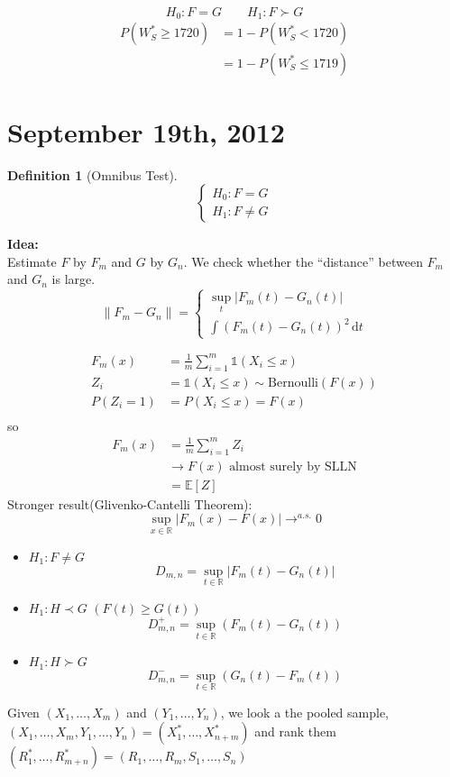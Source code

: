 \documentclass[a4paper,12pt]{amsart}
\newcommand{\sumim}{\sum_{i=1}^m}
\newcommand{\dt}{\,\mathrm{d}t}
\newcommand{\E}[1]{\mathbb{E}\left[#1\right]}
\newtheorem{defn}{Definition}
\begin{document}
\[H_0: F =G \qquad H_1: F \succ G\]
\begin{align*}
P(W_S^* \geq 1720 ) &= 1 - P(W_S^* < 1720)\\
&= 1 - P(W_S^* \leq 1719)
\end{align*}


\section{September 19th, 2012}
\begin{defn}[Omnibus Test]
\[\begin{cases}
H_0: F=G\\
H_1: F \neq G
\end{cases}\]
\end{defn}
\noindent
\textbf{Idea:}\\
Estimate $F$ by $F_m$ and $G$ by $G_n$. We check whether the ``distance'' between $F_m$ and $G_n$ is large.
\[\|F_m - G_n\| = 
\begin{cases}
\sup_t |F_m(t) - G_n(t)|\\
\int (F_m(t)-G_n(t))^2 \dt
\end{cases}
\]

\begin{align*}
F_m(x) &= \frac{1}{m}\sumim \mathds{1}(X_i\leq x)\\
Z_i &= \mathds{1}(X_i \leq x) \sim \mbox{Bernoulli}(F(x))\\
P(Z_i = 1) &= P(X_i \leq x) = F(x)\\
\end{align*}
so
\begin{align*}
F_m(x) &= \frac{1}{m}\sumim Z_i\\
&\to F(x) \mbox{ almost surely by SLLN}\\
&= \E{Z}
\end{align*}
\noindent
Stronger result(Glivenko-Cantelli Theorem):\\
\[\sup_{x \in \mathbb{R}} |F_m(x) - F(x)| \to^{a.s.} 0 \]

\begin{itemize}
\item $H_1: F \neq G$
\[D_{m,n} = \sup_{t \in \mathbb{R}} |F_m(t) - G_n(t)|\]
\item $H_1: H \prec G$ $(F(t) \geq G(t))$
\[D_{m,n}^+ = \sup_{t \in \mathbb{R}} (F_m(t) - G_n(t))\]
\item $H_1: H \succ G$
\[D_{m,n}^- = \sup_{t \in \mathbb{R}} (G_n(t) - F_m(t))\]
\end{itemize}


\noindent
Given $(X_1,\ldots,X_m)$ and $(Y_1,\ldots,Y_n)$, we look a the pooled sample, $(X_1,\ldots,X_m,Y_1,\ldots,Y_n) = (X_1^*, \ldots, X_{n+m}^*)$ and rank them
$(R_1^*, \ldots, R_{m+n}^*) = (R_1,\ldots,R_m,S_1,\ldots,S_n)$
\end{document}
